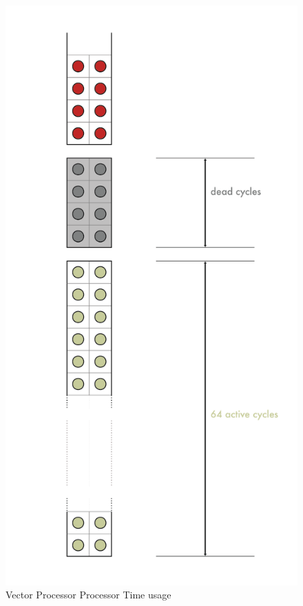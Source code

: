 \begin{figure}[H]
    \centering
    \includegraphics[scale = 0.4]{Chapter_1/img/time-usage.png}
    \caption{Vector Processor Processor Time usage \cite{L15-Krste}}
    \label{Vectoring}
\end{figure}

